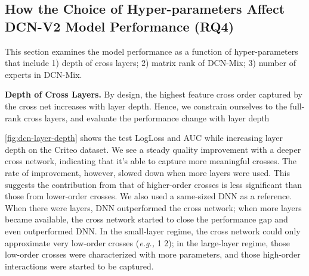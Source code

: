 \documentclass[sigconf]{acmart}
\begin{document}
\subsection{How the Choice of Hyper-parameters Affect {DCN-V2} Model Performance (RQ4)} 
\label{sec:hyper-parameters}
This section examines the model performance as a function of hyper-parameters that include 1) depth of cross layers; 2) matrix rank of {DCN-Mix}; 3) number of experts in {DCN-Mix}.

{\bf Depth of Cross Layers.}
By design, the highest feature cross order captured by the cross net increases with layer depth. Hence, we constrain ourselves to the full-rank cross layers, and evaluate the performance change with layer depth

\autoref{fig:dcn-layer-depth} shows the test LogLoss and AUC while increasing layer depth on the Criteo dataset. We see a steady quality improvement with a deeper cross network, indicating that it's able to capture more meaningful crosses. The rate of improvement, however, slowed down when more layers were used. This suggests the contribution from that of higher-order crosses is less significant than those from lower-order crosses. We also used a same-sized DNN as a reference. When there were  layers, DNN outperformed the cross network; when more layers became available, the cross network started to close the performance gap and even outperformed DNN. In the small-layer regime, the cross network could only approximate very low-order crosses (\emph{e.g.,} 1  2); in the large-layer regime, those low-order crosses were characterized with more parameters, and those high-order interactions were started to be captured.
\end{document}
